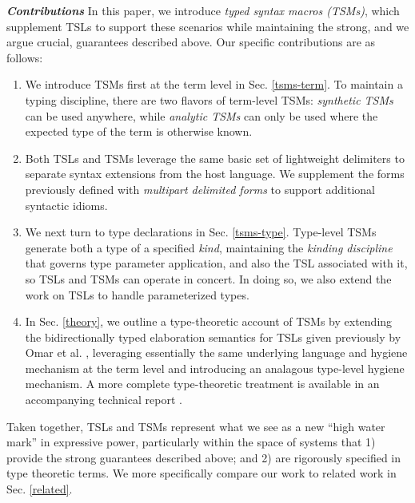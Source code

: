 \documentclass{sig-alternate}[10pt]
\begin{document}
\vspace{3px}
\noindent\textbf{\textit{Contributions}} In this paper, we introduce \emph{typed syntax macros (TSMs)}, which supplement TSLs to support these scenarios while maintaining the strong, and we argue crucial, guarantees described above. Our specific contributions are as follows:%
\begin{enumerate}[noitemsep]
\item We introduce TSMs first at the term level in Sec. \ref{tsms-term}.  To maintain a typing discipline, there are two flavors of term-level TSMs: \emph{synthetic TSMs} can be used anywhere, while \emph{analytic TSMs} can only be used where the expected type of the term is otherwise known. 
\item Both TSLs and TSMs leverage the same basic set of  lightweight delimiters to separate syntax extensions from the host language. We supplement the forms previously defined with \emph{multipart delimited forms} to support additional syntactic idioms.
\item We next turn to type declarations  in Sec. \ref{tsms-type}. Type-level TSMs generate both a type of a specified \emph{kind}, maintaining the \emph{kinding discipline} that governs type parameter application, and also the TSL associated with it, so TSLs and TSMs can operate in concert. In doing so, we also extend the work on TSLs to handle parameterized types. %
\item In Sec. \ref{theory}, we outline a type-theoretic account of TSMs by extending the bidirectionally typed elaboration semantics for TSLs given previously by Omar et al. \cite{TSLs}, leveraging essentially the same underlying language and hygiene mechanism at the term level and introducing an analagous type-level hygiene mechanism. A more complete type-theoretic treatment is available in an accompanying technical report \cite{tsmtr}.%
\end{enumerate}

Taken together, TSLs and TSMs represent what we see as a new ``high water mark'' in expressive power, particularly within the space of systems that 1) provide the strong  guarantees described above; and 2) are rigorously specified in type theoretic terms. We more specifically compare our work to related work in Sec. \ref{related}. 
\end{document}
